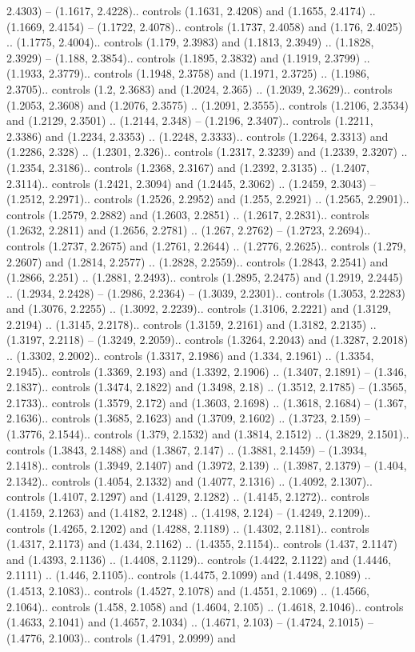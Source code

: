 2.4303) -- (1.1617, 2.4228).. controls (1.1631, 2.4208) and (1.1655, 2.4174) .. (1.1669, 2.4154) -- (1.1722, 2.4078).. controls (1.1737, 2.4058) and (1.176, 2.4025) .. (1.1775, 2.4004).. controls (1.179, 2.3983) and (1.1813, 2.3949) .. (1.1828, 2.3929) -- (1.188, 2.3854).. controls (1.1895, 2.3832) and (1.1919, 2.3799) .. (1.1933, 2.3779).. controls (1.1948, 2.3758) and (1.1971, 2.3725) .. (1.1986, 2.3705).. controls (1.2, 2.3683) and (1.2024, 2.365) .. (1.2039, 2.3629).. controls (1.2053, 2.3608) and (1.2076, 2.3575) .. (1.2091, 2.3555).. controls (1.2106, 2.3534) and (1.2129, 2.3501) .. (1.2144, 2.348) -- (1.2196, 2.3407).. controls (1.2211, 2.3386) and (1.2234, 2.3353) .. (1.2248, 2.3333).. controls (1.2264, 2.3313) and (1.2286, 2.328) .. (1.2301, 2.326).. controls (1.2317, 2.3239) and (1.2339, 2.3207) .. (1.2354, 2.3186).. controls (1.2368, 2.3167) and (1.2392, 2.3135) .. (1.2407, 2.3114).. controls (1.2421, 2.3094) and (1.2445, 2.3062) .. (1.2459, 2.3043) -- (1.2512, 2.2971).. controls (1.2526, 2.2952) and (1.255, 2.2921) .. (1.2565, 2.2901).. controls (1.2579, 2.2882) and (1.2603, 2.2851) .. (1.2617, 2.2831).. controls (1.2632, 2.2811) and (1.2656, 2.2781) .. (1.267, 2.2762) -- (1.2723, 2.2694).. controls (1.2737, 2.2675) and (1.2761, 2.2644) .. (1.2776, 2.2625).. controls (1.279, 2.2607) and (1.2814, 2.2577) .. (1.2828, 2.2559).. controls (1.2843, 2.2541) and (1.2866, 2.251) .. (1.2881, 2.2493).. controls (1.2895, 2.2475) and (1.2919, 2.2445) .. (1.2934, 2.2428) -- (1.2986, 2.2364) -- (1.3039, 2.2301).. controls (1.3053, 2.2283) and (1.3076, 2.2255) .. (1.3092, 2.2239).. controls (1.3106, 2.2221) and (1.3129, 2.2194) .. (1.3145, 2.2178).. controls (1.3159, 2.2161) and (1.3182, 2.2135) .. (1.3197, 2.2118) -- (1.3249, 2.2059).. controls (1.3264, 2.2043) and (1.3287, 2.2018) .. (1.3302, 2.2002).. controls (1.3317, 2.1986) and (1.334, 2.1961) .. (1.3354, 2.1945).. controls (1.3369, 2.193) and (1.3392, 2.1906) .. (1.3407, 2.1891) -- (1.346, 2.1837).. controls (1.3474, 2.1822) and (1.3498, 2.18) .. (1.3512, 2.1785) -- (1.3565, 2.1733).. controls (1.3579, 2.172) and (1.3603, 2.1698) .. (1.3618, 2.1684) -- (1.367, 2.1636).. controls (1.3685, 2.1623) and (1.3709, 2.1602) .. (1.3723, 2.159) -- (1.3776, 2.1544).. controls (1.379, 2.1532) and (1.3814, 2.1512) .. (1.3829, 2.1501).. controls (1.3843, 2.1488) and (1.3867, 2.147) .. (1.3881, 2.1459) -- (1.3934, 2.1418).. controls (1.3949, 2.1407) and (1.3972, 2.139) .. (1.3987, 2.1379) -- (1.404, 2.1342).. controls (1.4054, 2.1332) and (1.4077, 2.1316) .. (1.4092, 2.1307).. controls (1.4107, 2.1297) and (1.4129, 2.1282) .. (1.4145, 2.1272).. controls (1.4159, 2.1263) and (1.4182, 2.1248) .. (1.4198, 2.124) -- (1.4249, 2.1209).. controls (1.4265, 2.1202) and (1.4288, 2.1189) .. (1.4302, 2.1181).. controls (1.4317, 2.1173) and (1.434, 2.1162) .. (1.4355, 2.1154).. controls (1.437, 2.1147) and (1.4393, 2.1136) .. (1.4408, 2.1129).. controls (1.4422, 2.1122) and (1.4446, 2.1111) .. (1.446, 2.1105).. controls (1.4475, 2.1099) and (1.4498, 2.1089) .. (1.4513, 2.1083).. controls (1.4527, 2.1078) and (1.4551, 2.1069) .. (1.4566, 2.1064).. controls (1.458, 2.1058) and (1.4604, 2.105) .. (1.4618, 2.1046).. controls (1.4633, 2.1041) and (1.4657, 2.1034) .. (1.4671, 2.103) -- (1.4724, 2.1015) -- (1.4776, 2.1003).. controls (1.4791, 2.0999) and 
